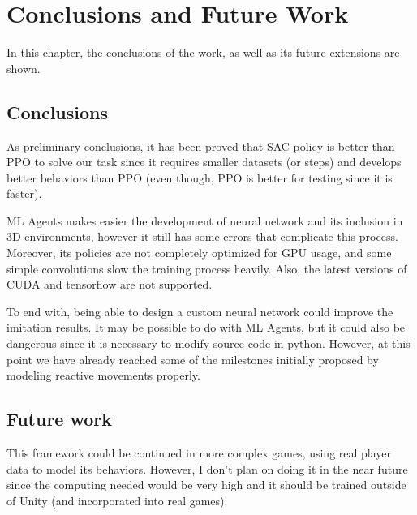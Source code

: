 %
%
%

\chapter{Conclusions and Future Work}

\minitoc{}

\bigskip{}

In this chapter, the conclusions of the work, as well as its future extensions are shown.

\section{Conclusions}

As preliminary conclusions, it has been proved that SAC policy is better than PPO to solve our task since it requires smaller datasets (or steps) and develops better behaviors than PPO (even though, PPO is better for testing since it is faster).

ML Agents makes easier the development of neural network and its inclusion in 3D environments, however it still has some errors that complicate this process. Moreover, its policies are not completely optimized for GPU usage, and some simple convolutions slow the training process heavily. Also, the latest versions of CUDA and tensorflow are not supported.

To end with, being able to design a custom neural network could improve the imitation results. It may be possible to do with ML Agents, but it could also be dangerous since it is necessary to modify source code in python. However, at this point we have already reached some of the milestones initially proposed by modeling reactive movements properly.

\section{Future work}

This framework could be continued in more complex games, using real player data to model its behaviors. However, I don't plan on doing it in the near future since the computing needed would be very high and it should be trained outside of Unity (and incorporated into real games).